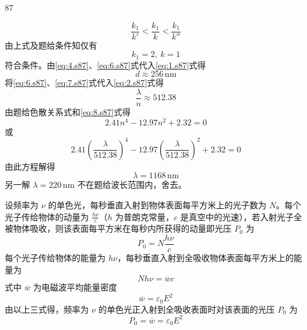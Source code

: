 \begin{solution}{87}
\begin{subsolution}
\begin{subsubsolution}
            \[
                \frac{k_{1}}{k'} < \frac{k_{1}}{k} < \frac{k_{1}}{k''}
            \]
            由上式及题给条件知仅有
            \begin{equation}
                k_{1} = 2,\ k = 1
                \label{eq:6.s87}
            \end{equation}
            符合条件。由\eqref{eq:4.s87}、\eqref{eq:6.s87}式代入\eqref{eq:1.s87}式得
            \begin{equation}
                d \approx 256\,\mathrm{nm}
                \label{eq:7.s87}
            \end{equation}
            将\eqref{eq:6.s87}、\eqref{eq:7.s87}式代入\eqref{eq:2.s87}式得
            \begin{equation}
                \frac{\lambda}{n} \approx 512.38
                \label{eq:8.s87}
            \end{equation}
            由题给色散关系式和\eqref{eq:8.s87}式得
            \[
                2.41 n^{4} - 12.97 n^{2} + 2.32 = 0
            \]
            或
            \[
                2.41 \left(\frac{\lambda}{512.38}\right)^{4} - 12.97 \left(\frac{\lambda}{512.38}\right)^{2} + 2.32 = 0
            \]
            由此方程解得
            \begin{equation}
                \lambda = 1168\,\mathrm{nm}
                \label{eq:9.s87}
            \end{equation}
            另一解 $\lambda = 220\,\mathrm{nm}$ 不在题给波长范围内，舍去。
        \end{subsubsolution}
        \begin{subsubsolution}
            设频率为 $\nu$ 的单色光，每秒垂直入射到物体表面每平方米上的光子数为 $N$。每个光子传给物体的动量为 $\frac{h\nu}{c}$（$h$ 为普朗克常量，$c$ 是真空中的光速），若入射光子全被物体吸收，则该表面每平方米在每秒内所获得的动量即光压 $P_{0}$ 为
            \[
                P_{0} = N \frac{h\nu}{c}
            \]
            每个光子传给物体的能量为 $h\nu$，每秒垂直入射到全吸收物体表面每平方米上的能量为
            \[
                N h\nu = \overline{w} c
            \]
            式中 $\overline{w}$ 为电磁波平均能量密度
            \[
                \overline{w} = \varepsilon_{0} E^{2}
            \]
            由以上三式得，频率为 $\nu$ 的单色光正入射到全吸收表面时对该表面的光压 $P_{0}$ 为
            \begin{equation}
                P_{0} = \overline{w} = \varepsilon_{0} E^{2}
                \label{eq:10.s87}
            \end{equation}

\end{subsubsolution}
\end{subsolution}
\end{solution}
